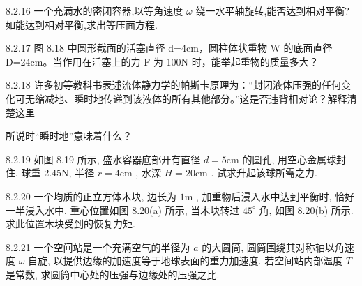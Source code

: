 \begin{problem}{8.2.16}
一个充满水的密闭容器,以等角速度 $\omega$ 绕一水平轴旋转,能否达到相对平衡?如能达到相对平衡,求出等压面方程.
\end{problem}
\clearpage


\begin{problem}{8.2.17}
图 8.18 中圆形截面的活塞直径 d=4cm，圆柱体状重物 W 的底面直径 D=24cm。当作用在活塞上的力 F 为 100N 时，能举起重物的质量多大？
\begin{center}

\end{center}
\end{problem}
\clearpage


\begin{problem}{8.2.18}
许多初等教科书表述流体静力学的帕斯卡原理为：“封闭液体压强的任何变化可无缩减地、瞬时地传递到该液体的所有其他部分。”这是否违背相对论？解释清楚这里

所说时“瞬时地”意味着什么？
\end{problem}
\clearpage


\begin{problem}{8.2.19}
如图 8.19 所示, 盛水容器底部开有直径 $d = 5\mathrm{cm}$ 的圆孔, 用空心金属球封住. 球重 2.45N, 半径 $r = 4\mathrm{cm}$ , 水深 $H = 20\mathrm{cm}$ . 试求升起该球所需之力.
\begin{center}

\end{center}
\end{problem}
\clearpage


\begin{problem}{8.2.20}
一个均质的正立方体木块, 边长为 $1\mathrm{m}$ , 加重物后浸入水中达到平衡时, 恰好一半浸入水中, 重心位置如图 8.20(a) 所示, 当木块转过 $45^{\circ}$ 角, 如图 8.20(b) 所示. 求此位置木块受到的恢复力矩.
\begin{center}

\end{center}
\end{problem}
\clearpage


\begin{problem}{8.2.21}
一个空间站是一个充满空气的半径为 $a$ 的大圆筒, 圆筒围绕其对称轴以角速度 $\omega$ 自旋, 以提供边缘的加速度等于地球表面的重力加速度. 若空间站内部温度 $T$ 是常数, 求圆筒中心处的压强与边缘处的压强之比.
\end{problem}
\clearpage


